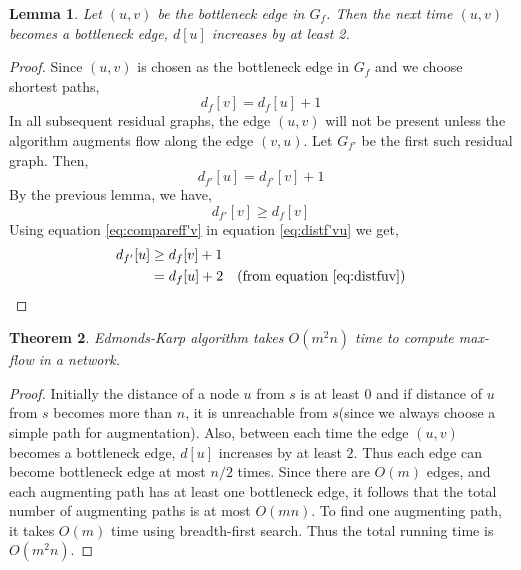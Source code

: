 \documentclass[10pt]{article}
\newtheorem{theorem}{Theorem}
\newtheorem{lemma}[theorem]{Lemma}
\begin{document}
\bigskip

\begin{lemma}
Let $(u,v)$ be the bottleneck edge in $G_f$. Then the next time $(u,v)$ becomes a bottleneck edge, $d[u]$ increases by at least 2.
\end{lemma}
\begin{proof}
Since $(u,v)$ is chosen as the bottleneck edge in $G_f$ and we choose shortest paths,
\begin{equation}
\label{eq:distfuv}
d_f[v] = d_f[u] + 1
\end{equation}
In all subsequent residual graphs, the edge $(u,v)$ will not be present unless the algorithm augments flow along the edge $(v,u)$. Let $G_{f'}$ be the first such residual graph. Then,
\begin{equation}
\label{eq:distf'vu}
d_{f'}[u] = d_{f'}[v] + 1
\end{equation}
By the previous lemma, we have,
\begin{equation}
\label{eq:compareff'v}
d_{f'}[v] \geq d_f[v]
\end{equation}
Using equation \ref{eq:compareff'v} in equation \ref{eq:distf'vu} we get,
\begin{align*}
d_{f'}[u]   & \geq d_f[v] + 1       & \\
            & = d_f[u] + 2          & \text{(from equation \ref{eq:distfuv})} \\
\end{align*}
\end{proof}
\bigskip

\begin{theorem}
Edmonds-Karp algorithm takes $O(m^2n)$ time to compute max-flow in a network.
\end{theorem}
\begin{proof}
Initially the distance of a node $u$ from $s$ is at least $0$ and if distance of $u$ from $s$ becomes more than $n$, it is unreachable from $s$(since we always choose a simple path for augmentation). Also, between each time the edge $(u,v)$ becomes a bottleneck edge, $d[u]$ increases by at least $2$. Thus each edge can become bottleneck edge at most $n/2$ times. Since there are $O(m)$ edges, and each augmenting path has at least one bottleneck edge, it follows that the total number of augmenting paths is at most $O(mn)$. To find one augmenting path, it takes $O(m)$ time using breadth-first search. Thus the total running time is $O(m^2n)$.
\end{proof}
\end{document}
